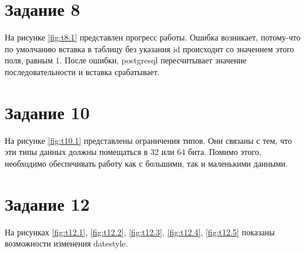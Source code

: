 \begin{myfigure}{6.1}
  \caption{Эксперименты с NaN, часть 1}
  \label{fig:t6.1}
\end{myfigure}

\begin{myfigure}{6.2}
  \caption{Эксперименты с NaN, часть 2}
  \label{fig:t6.2}
\end{myfigure}

\section{Задание 8}

На рисунке \ref{fig:t8.1} представлен прогресс работы. Ошибка возникает, потому-что по умолчанию вставка в таблицу без указания id происходит со значением этого поля, равным 1. После ошибки, postgresql пересчитывает значение последовательности и вставка срабатывает.

\begin{myfigure}{8.1}
  \caption{Манипулирование строками}
  \label{fig:t8.1}
\end{myfigure}

\section{Задание 10}

На рисунке \ref{fig:t10.1} представлены ограничения типов. Они связаны с тем, что эти типы данных должны помещаться в 32 или 64 бита. Помимо этого, необходимо обеспечивать работу как с большими, так и маленькими данными.

\begin{myfigure}{10.1}
  \caption{Ограничения типов данных}
  \label{fig:t10.1}
\end{myfigure}

\section{Задание 12}

На рисунках \ref{fig:t12.1}, \ref{fig:t12.2}, \ref{fig:t12.3}, \ref{fig:t12.4}, \ref{fig:t12.5} показаны возможности изменения datestyle.

\begin{myfigure}{12.1}
  \caption{Экспериментирование с datestyle, часть 1}
  \label{fig:t12.1}
\end{myfigure}

\begin{myfigure}{12.2}
  \caption{Экспериментирование с datestyle, часть 2}
  \label{fig:t12.2}
\end{myfigure}


